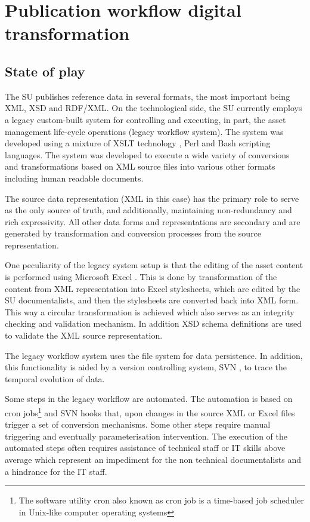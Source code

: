 \section{Publication workflow digital transformation}
\label{sec:context}


	\subsection{State of play}
	The SU publishes reference data in several formats, the most important being XML, XSD and RDF/XML. On the technological side, the SU currently employs a legacy custom-built system for controlling and executing, in part, the asset management life-cycle operations (legacy workflow system). The system was developed using a mixture of XSLT technology \cite{xslt3-Kay}, Perl and Bash scripting languages. The system was developed to execute a wide variety of conversions and transformations based on XML source files into various other formats including human readable documents.
	 
	The source data representation (XML in this case) has the primary role to serve as the only source of truth, and additionally, maintaining non-redundancy and rich expressivity. All other data forms and representations are secondary and are generated by transformation and conversion processes from the source representation.
	 
	One peculiarity of the legacy system setup is that the editing of the asset content is performed using Microsoft Excel \citep{excel}. This is done by transformation of the content from XML representation into Excel stylesheets, which are edited by the SU documentalists, and then the stylesheets are converted back into XML form. This way a circular transformation is achieved which also serves as an integrity checking and validation mechanism. In addition XSD schema definitions are used to validate the XML source representation.
	 
	The legacy workflow system uses the file system for data persistence. In addition, this functionality is aided by a version controlling system, SVN \cite{svn}, to trace the temporal evolution of data.
	 
	Some steps in the legacy workflow are automated. The automation is based on cron jobs\footnote{The software utility cron also known as cron job is a time-based job scheduler in Unix-like computer operating systems} and SVN hooks that, upon changes in the source XML or Excel files trigger a set of conversion mechanisms.  Some other steps require manual triggering and eventually parameterisation intervention. The execution of the automated steps often requires assistance of technical staff or IT skills above average which represent an impediment for the non technical documentalists and a hindrance for the IT staff.
	 
